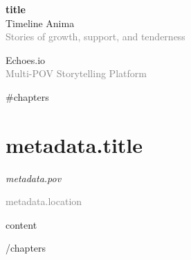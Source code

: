 \documentclass[12pt,a5paper]{book}
\newcommand{\echochapter}[4]{
  \chapter{#1}
  \begin{flushright}
    \textit{\textcolor{animadark}{#2}} %
  \end{flushright}
  \vspace{0.5em}
  \textcolor{gray}{\small #3} %
  \vspace{1em}
  
  #4 %
}
\newcommand{\timelinetitle}[1]{
  \begin{center}
    {\Huge\textcolor{animagreen}{\textbf{#1}}}\\
    \vspace{0.5em}
    {\large\textcolor{animadark}{Timeline Anima}}\\
    \vspace{0.2em}
    {\small\textcolor{gray}{Stories of growth, support, and tenderness}}
  \end{center}
}
\begin{document}
\thispagestyle{empty}
\vspace*{2cm}
\timelinetitle{{{title}}}
\vfill
\begin{center}
  \textcolor{animadark}{Echoes.io}\\
  \textcolor{gray}{\small Multi-POV Storytelling Platform}
\end{center}
\newpage

\tableofcontents
\newpage

{{#chapters}}
\echochapter{{{metadata.title}}}{{{metadata.pov}}}{{{metadata.location}}}{
{{content}}
}
\newpage
{{/chapters}}
\end{document}
